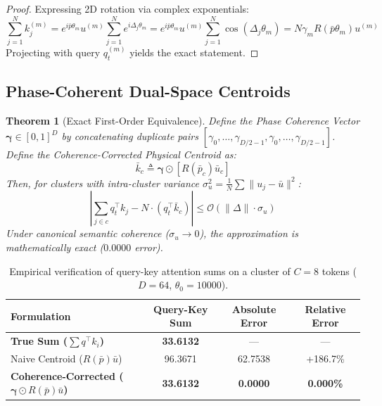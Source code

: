 \documentclass[11pt,a4paper]{article}
\newtheorem{theorem}{Theorem}
\begin{document}
\begin{proof}
Expressing 2D rotation via complex exponentials:
\begin{equation}
\sum_{j=1}^N k_j^{(m)} = e^{i \bar{p} \theta_m} u^{(m)} \sum_{j=1}^N e^{i \Delta_j \theta_m} = e^{i \bar{p} \theta_m} u^{(m)} \sum_{j=1}^N \cos(\Delta_j \theta_m) = N \gamma_m R(\bar{p}\theta_m) u^{(m)}
\end{equation}
Projecting with query $q_t^{(m)}$ yields the exact statement.
\end{proof}

\subsection{Phase-Coherent Dual-Space Centroids}
\begin{theorem}[Exact First-Order Equivalence]
Define the Phase Coherence Vector $\boldsymbol{\gamma} \in [0, 1]^D$ by concatenating duplicate pairs $[\gamma_0, \dots, \gamma_{D/2-1}, \gamma_0, \dots, \gamma_{D/2-1}]$.
Define the Coherence-Corrected Physical Centroid as:
\begin{equation}
\bar{k}_c \triangleq \boldsymbol{\gamma} \odot \left[ R(\bar{p}_c) \bar{u}_c \right]
\end{equation}
Then, for clusters with intra-cluster variance $\sigma_u^2 = \frac{1}{N} \sum \|u_j - \bar{u}\|^2$:
\begin{equation}
\left| \sum_{j \in c} q_t^\top k_j - N \cdot (q_t^\top \bar{k}_c) \right| \le \mathcal{O}(\|\Delta\| \cdot \sigma_u)
\end{equation}
Under canonical semantic coherence ($\sigma_u \to 0$), the approximation is mathematically exact ($0.0000$ error).
\end{theorem}

\begin{table}[h]
\centering
\caption{Empirical verification of query-key attention sums on a cluster of $C=8$ tokens ($D=64$, $\theta_0=10000$).}
\begin{tabular}{lccc}
\toprule
Formulation & Query-Key Sum & Absolute Error & Relative Error \\
\midrule
\textbf{True Sum ($\sum q^\top k_i$)} & \textbf{33.6132} & — & — \\
Naive Centroid ($R(\bar{p})\bar{u}$) & 96.3671 & 62.7538 & +186.7\% \\
\textbf{Coherence-Corrected ($\boldsymbol{\gamma} \odot R(\bar{p})\bar{u}$)} & \textbf{33.6132} & \textbf{0.0000} & \textbf{0.000\%} \\
\bottomrule
\end{tabular}
\end{table}
\end{document}
